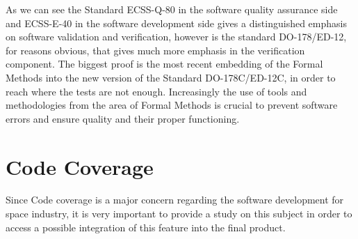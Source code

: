 {As we can see the Standard ECSS-Q-80\cite{ecss-q-st-80c} in the software quality assurance side and ECSS-E-40\cite{ecss-e-st-40c} in the software development side
gives a distinguished emphasis on software validation and verification, however is the standard DO-178/ED-12, for reasons obvious,
that gives much more emphasis in the verification component. The biggest proof is the most recent embedding of the Formal Methods into the
new version of the Standard DO-178C/ED-12C, in order to reach where the tests are not enough.
Increasingly the use of tools and methodologies from the area of Formal Methods is crucial to prevent software errors and ensure quality and their proper functioning.

\section{Code Coverage}\label{sec:ccoverage}
Since Code coverage is a major concern regarding the software development for space industry, it is very important to provide a study on this subject
in order to access a possible integration of this feature into the final product.

}
